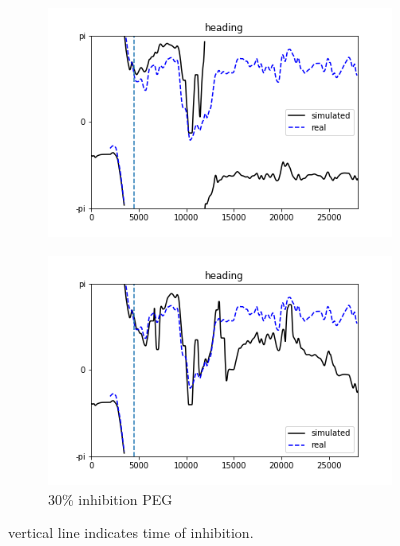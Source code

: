\documentclass{article}
\begin{document}
\begin{figure}[h]
	\centering
	\begin{subfigure}[t]{0.48\linewidth}
		\centering
		\includegraphics[width = 1.0\linewidth, trim={0 0 0 0}, clip=true]{../figures/sim_head_PEN1_07.png}
		\label{fig:F}	
	\end{subfigure}
	\hspace{0.01\linewidth}
	\begin{subfigure}[t]{0.48\linewidth}
		\centering
		\includegraphics[width = 1.0\linewidth, trim={0 0 0 0}, clip=true]{../figures/sim_head_PEG_07.png}
		\caption{30\% inhibition PEG}
		\label{fig:dF}
	\end{subfigure}
\caption{vertical line indicates time of inhibition.}
\label{fig:fit}
\end{figure}
\end{document}
